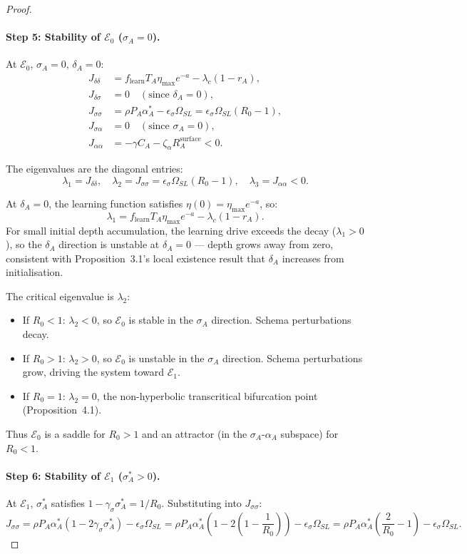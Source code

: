 \begin{proof}
\paragraph{Step 5: Stability of $\mathcal{E}_0$ ($\sigma_A = 0$).}
At $\mathcal{E}_0$, $\sigma_A = 0$, $\delta_A = 0$:
\begin{align*}
J_{\delta\delta} &= f_{\text{learn}} T_A \eta_{\max} e^{-a} - \lambda_c (1 - r_A), \\
J_{\delta\sigma} &= 0 \quad (\text{since } \delta_A = 0), \\
J_{\sigma\sigma} &= \rho P_A \alpha_A^* - \epsilon_\sigma \Omega_{SL}
= \epsilon_\sigma \Omega_{SL} (R_0 - 1), \\
J_{\sigma\alpha} &= 0 \quad (\text{since } \sigma_A = 0), \\
J_{\alpha\alpha} &= -\gamma C_A - \zeta_\alpha R_A^{\text{surface}} < 0.
\end{align*}

The eigenvalues are the diagonal entries:
\[
\lambda_1 = J_{\delta\delta},\quad
\lambda_2 = J_{\sigma\sigma} = \epsilon_\sigma \Omega_{SL} (R_0 - 1),\quad
\lambda_3 = J_{\alpha\alpha} < 0.
\]

At $\delta_A = 0$, the learning function satisfies
$\eta(0) = \eta_{\max} e^{-a}$, so:
\[
\lambda_1 = f_{\text{learn}} T_A \eta_{\max} e^{-a} - \lambda_c (1 - r_A).
\]
For small initial depth accumulation, the learning drive exceeds the
decay ($\lambda_1 > 0$), so the $\delta_A$ direction is unstable at
$\delta_A = 0$ --- depth grows away from zero, consistent with
Proposition~3.1's local existence result that $\delta_A$ increases
from initialisation.

The critical eigenvalue is $\lambda_2$:
\begin{itemize}
\item If $R_0 < 1$: $\lambda_2 < 0$, so $\mathcal{E}_0$ is stable in
  the $\sigma_A$ direction. Schema perturbations decay.
\item If $R_0 > 1$: $\lambda_2 > 0$, so $\mathcal{E}_0$ is unstable
  in the $\sigma_A$ direction. Schema perturbations grow, driving the
  system toward $\mathcal{E}_1$.
\item If $R_0 = 1$: $\lambda_2 = 0$, the non-hyperbolic transcritical
  bifurcation point (Proposition~4.1).
\end{itemize}

Thus $\mathcal{E}_0$ is a saddle for $R_0 > 1$ and an attractor
(in the $\sigma_A$-$\alpha_A$ subspace) for $R_0 < 1$.

\paragraph{Step 6: Stability of $\mathcal{E}_1$ ($\sigma_A^* > 0$).}
At $\mathcal{E}_1$, $\sigma_A^*$ satisfies $1 - \gamma_\sigma \sigma_A^* = 1/R_0$.
Substituting into $J_{\sigma\sigma}$:
\[
J_{\sigma\sigma} = \rho P_A \alpha_A^* (1 - 2\gamma_\sigma \sigma_A^*) - \epsilon_\sigma \Omega_{SL}
= \rho P_A \alpha_A^* \left(1 - 2\left(1 - \frac{1}{R_0}\right)\right) - \epsilon_\sigma \Omega_{SL}
= \rho P_A \alpha_A^* \left(\frac{2}{R_0} - 1\right) - \epsilon_\sigma \Omega_{SL}.
\]


\end{proof}
